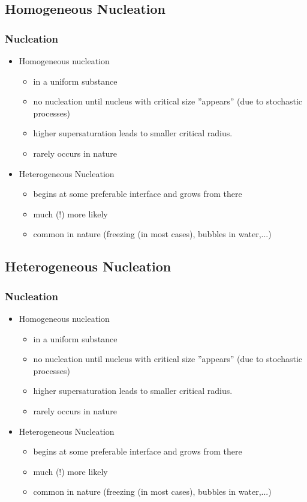 \documentclass{beamer}
\begin{document}
\subsection{Homogeneous  Nucleation}\begin{frame}\frametitle{Nucleation}
\begin{itemize}
\item
Homogeneous nucleation
\begin{itemize}
\item in a uniform substance
\item no nucleation until nucleus with critical size ''appears'' (due to stochastic processes)
\item higher supersaturation leads to smaller critical radius.
\item rarely occurs in nature
\end{itemize}
\item Heterogeneous Nucleation{}
\begin{itemize}
\item begins at some preferable interface and grows from there
\item much (!) more likely
\item common in nature (freezing (in most cases), bubbles in water,...)
\end{itemize}
\end{itemize}
\end{frame}


\subsection{Heterogeneous  Nucleation}
\begin{frame}\frametitle{Nucleation}
\begin{itemize}
\item
Homogeneous nucleation
\begin{itemize}
\item in a uniform substance
\item no nucleation until nucleus with critical size ''appears'' (due to stochastic processes)
\item higher supersaturation leads to smaller critical radius.
\item rarely occurs in nature
\end{itemize}
\item Heterogeneous Nucleation{}
\begin{itemize}
\item begins at some preferable interface and grows from there
\item much (!) more likely
\item common in nature (freezing (in most cases), bubbles in water,...)
\end{itemize}
\end{itemize}
\end{frame}
\end{document}
